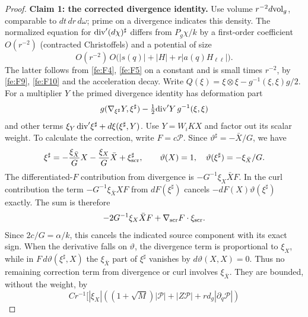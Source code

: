 \begin{proof}
\par\medskip\noindent\textbf{Claim 1: the corrected divergence identity.}\quad
Use volume \(r^{-2}d{\rm vol}_g\), comparable to \(dt\,dr\,d\omega\); prime on a divergence indicates this density. The normalized equation for \({\rm div}'(d\chi)^\sharp\) differs from \(P_g\chi/k\) by a first-order coefficient \(O(r^{-2})\) (contracted Christoffels) and a potential of size
\begin{equation*}
O(r^{-2})\,O\big(|s(q)|+|H|+r|a(q)H_{\ell\ell}|\big).
\end{equation*}
The latter follows from \eqref{fe:F4}, \eqref{fe:F5} on a constant and is small times \(r^{-2}\), by \eqref{fe:F9}, \eqref{fe:F10} and the acceleration decay. Write \(Q(\xi)=\xi\otimes\xi-g^{-1}(\xi,\xi)g/2\). For a multiplier \(Y\) the primed divergence identity has deformation part
\begin{equation*}
g(\nabla_{\xi^\sharp}Y,\xi^\sharp)
                          -\tfrac12{\rm div}'Y\,g^{-1}(\xi,\xi)
\end{equation*}
and other terms \(\xi_Y\,{\rm div}'\xi^\sharp+d\xi(\xi^\sharp,Y)\).
Use $Y=W_iKX$ and factor out its scalar weight.  To calculate the
correction, write $F=c\mathcal P$.  Since
$\vartheta^\sharp=-\bar X/G$, we have
\begin{equation*}
 \xi^\sharp=-\frac{\xi_{\bar X}}G X-\frac{\xi_X}G\bar X
                 +\xi_{\rm scr}^{\sharp},\qquad
 \vartheta(X)=1,\quad \vartheta(\xi^\sharp)=-\xi_{\bar X}/G.
\end{equation*}
The differentiated-$F$ contribution from divergence is
$-G^{-1}\xi_X\bar XF$.  In the curl contribution the term
$-G^{-1}\xi_{\bar X}XF$ from $dF(\xi^\sharp)$ cancels
$-dF(X)\vartheta(\xi^\sharp)$ exactly.
The sum is therefore
\begin{equation*}
 -2G^{-1}\xi_X\bar XF
       +\nabla_{\rm scr}F\cdot\xi_{\rm scr}.
\end{equation*}
Since $2c/G=\alpha/k$, this cancels the indicated source component
with its exact sign.  When the derivative falls on $\vartheta$, the divergence term is
proportional to $\xi_X$, while in
$F\,d\vartheta(\xi^\sharp,X)$ the $\xi_{\bar X}$ part of
$\xi^\sharp$ vanishes by $d\vartheta(X,X)=0$.
Thus no remaining correction term from divergence or curl involves
$\xi_{\bar X}$. They are bounded, without the weight, by
\begin{equation*}
C r^{-1}
  \big[
  |\xi_X|((1+\sqrt M)|\mathcal P|+|Z\mathcal P|+r d_g|\partial_q\mathcal P|)

\end{equation*}
\end{proof}
